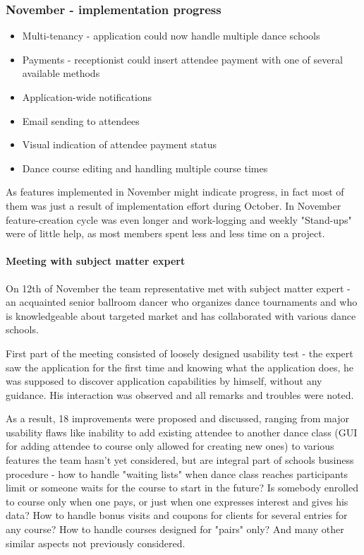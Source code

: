 \documentclass{article}
\begin{document}
\subsubsection{November - implementation progress}
\begin{itemize}
\item Multi-tenancy - application could now handle multiple dance schools 
\item Payments - receptionist could insert attendee payment with one of several available methods
\item Application-wide notifications
\item Email sending to attendees
\item Visual indication of attendee payment status
\item Dance course editing and handling multiple course times
\end{itemize}
As features implemented in November might indicate progress, in fact most of them was just a result of implementation effort during October. In November feature-creation cycle was even longer and work-logging and weekly "Stand-ups" were of little help, as most members spent less and less time on a project.

\paragraph{Meeting with subject matter expert}
On 12th of November the team representative met with subject matter expert - an acquainted senior ballroom dancer who organizes dance tournaments and who is knowledgeable about targeted market and has collaborated with various dance schools. 

First part of the meeting consisted of loosely designed usability test - the expert saw the application for the first time and knowing what the application does, he was supposed to discover application capabilities by himself, without any guidance. His interaction was observed and all remarks and troubles were noted.

As a result, 18 improvements were proposed and discussed, ranging from major usability flaws like inability to add existing attendee to another dance class (GUI for adding attendee to course only allowed for creating new ones) to various features the team hasn't yet considered, but are integral part of schools business procedure - how to handle "waiting lists" when dance class reaches participants limit or someone waits for the course to start in the future? Is somebody enrolled to course only when one pays, or just when one expresses interest and gives his data? How to handle bonus visits and coupons for clients for several entries for any course? How to handle courses designed for "pairs" only? And many other similar aspects not previously considered.
\end{document}
